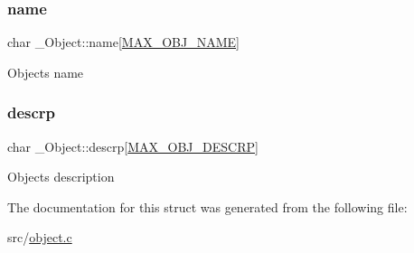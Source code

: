 \subsubsection{\texorpdfstring{name}{name}}
{\footnotesize\ttfamily char \+\_\+\+Object\+::name\mbox{[}\hyperlink{object_8h_a6a2f391825e94d06a3137b75abfa1bba}{M\+A\+X\+\_\+\+O\+B\+J\+\_\+\+N\+A\+ME}\mbox{]}}

Object\textquotesingle{}s name \mbox{\label{struct__Object_affa493ad8fdeafe924950f7388356a55}} 
\subsubsection{\texorpdfstring{descrp}{descrp}}
{\footnotesize\ttfamily char \+\_\+\+Object\+::descrp\mbox{[}\hyperlink{object_8h_a9c396da2f3b9f0191120ff1666af6381}{M\+A\+X\+\_\+\+O\+B\+J\+\_\+\+D\+E\+S\+C\+RP}\mbox{]}}

Object\textquotesingle{}s description 

The documentation for this struct was generated from the following file\+:\begin{DoxyCompactItemize}
\item 
src/\hyperlink{object_8c}{object.\+c}\end{DoxyCompactItemize}
